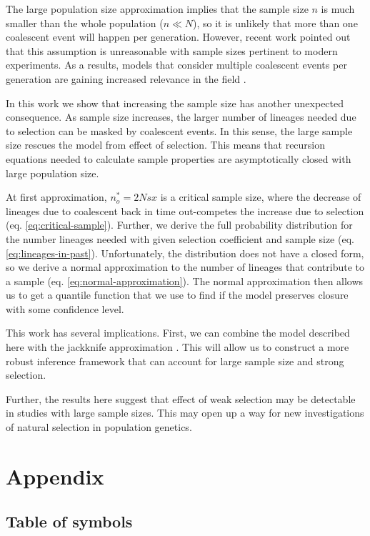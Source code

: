 \documentclass[review]{elsarticle}
\begin{document}
The large population size approximation implies that the sample size $n$ is much smaller than the
whole population ($n \ll N$), so it is unlikely that more than one coalescent event will happen per
generation. However, recent work \citep{BhaskarEtAl2014,NelsonEtAl2019} pointed out that this
assumption is unreasonable with sample sizes pertinent to modern experiments. As a results, models
that consider multiple coalescent events per generation are gaining increased relevance in the
field \citep{FlemmingtonVoit}.

In this work we show that increasing the sample size has another unexpected consequence. As sample
size increases, the larger number of lineages needed due to selection can be masked by coalescent
events. In this sense, the large sample size rescues the model from effect of selection. This means
that recursion equations needed to calculate sample properties are asymptotically closed with large
population size.

At first approximation, $n_o^*=2Nsx$ is a critical sample size, where the decrease of lineages due to
coalescent back in time out-competes the increase due to selection (eq. \eqref{eq:critical-sample}).
Further, we derive the full probability distribution for the number lineages needed with given
selection coefficient and sample size (eq. \eqref{eq:lineages-in-past}). Unfortunately, the
distribution does not have a closed form, so we derive a normal approximation to the number of
lineages that contribute to a sample (eq. \eqref{eq:normal-approximation}). The normal approximation
then allows us to get a quantile function that we use to find if the model preserves closure with
some confidence level.

This work has several implications. First, we can combine the model described here with the
jackknife approximation \citep{JouganousEtAl2017}. This will allow us to construct a more robust
inference framework that can account for large sample size and strong selection.

Further, the results here suggest that effect of weak selection may be detectable in studies with
large sample sizes. This may open up a way for new investigations of natural selection in population
genetics.



\section{Appendix}
\subsection{Table of symbols}
\end{document}
